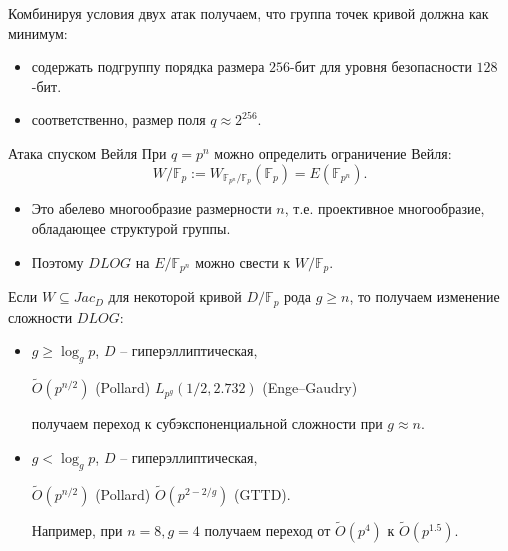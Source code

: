 \documentclass{beamer}
\begin{document}
\begin{frame}
    Комбинируя условия двух атак получаем, что группа точек кривой должна как минимум:
\begin{itemize}
    \item содержать подгруппу  порядка размера $256$-бит для уровня безопасности $128$-бит.
    \item соответственно, размер поля $q \approx 2^{256}$.
\end{itemize} 
\end{frame}

\begin{frame}{Атака спуском Вейля}
	При $q = p^n$ можно определить ограничение Вейля:
	\[
	W/\mathbb{F}_p := W_{\mathbb{F}_{p^n} / \mathbb{F}_p}(\mathbb{F}_p) = E(\mathbb{F}_{p^n}).
	\]

    \begin{itemize}
        \item Это абелево многообразие размерности $n$, т.е. проективное многообразие, обладающее структурой группы.
        \item Поэтому $DLOG$ на $E/\mathbb{F}_{p^n}$ можно свести к $W/\mathbb{F}_p$.
    \end{itemize}
\end{frame}

\begin{frame}
Если $W \subseteq Jac_D$ для некоторой кривой $D/\mathbb{F}_p$ рода $g \geq n$, то получаем изменение сложности $DLOG$:
\begin{itemize}
    \item $g \geq \log_g{p}$, $D$ -- гиперэллиптическая,%
    \begin{center}
      $\widetilde{O}(p^{n/2})$ (Pollard) \structure{$\implies$} $L_{p^g}(1/2, 2.732)$ (Enge–Gaudry)
    \end{center}
    получаем переход к субэкспоненциальной сложности при $g \approx n$.
    \item $g < \log_g{p}$, $D$ -- гиперэллиптическая,
    \begin{center}
        $\widetilde{O}(p^{n/2})$ (Pollard) \structure{$\implies$} $\widetilde{O}(p^{2-2/g})$ (GTTD).
    \end{center}
    Например, при $n = 8, g = 4$ получаем переход от $\widetilde{O}(p^{4})$ к $\widetilde{O}(p^{1.5})$.
\end{itemize}
\end{frame}
\end{document}
